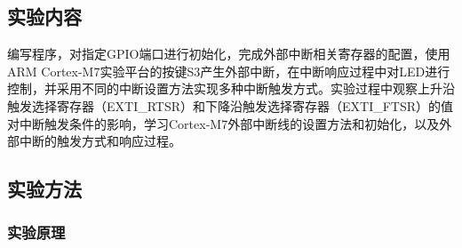 ﻿\documentclass[UTF8,12pt]{article}
\begin{document}
\subsection{实验内容}
编写程序，对指定GPIO端口进行初始化，完成外部中断相关寄存器的配置，使用ARM Cortex-M7实验平台的按键S3产生外部中断，在中断响应过程中对LED进行控制，并采用不同的中断设置方法实现多种中断触发方式。实验过程中观察上升沿触发选择寄存器（EXTI\_RTSR）和下降沿触发选择寄存器（EXTI\_FTSR）的值对中断触发条件的影响，学习Cortex-M7外部中断线的设置方法和初始化，以及外部中断的触发方式和响应过程。

\subsection{实验方法}
\subsubsection{实验原理}
\end{document}
